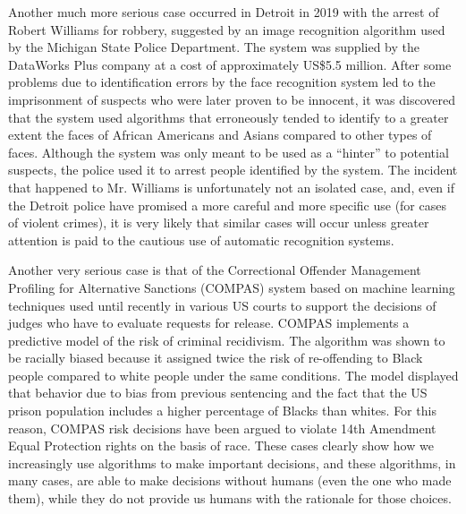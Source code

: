 Another much more serious case occurred in Detroit in 2019 with the arrest of Robert Williams for robbery, suggested by an image recognition algorithm used by the Michigan State Police Department. The system was supplied by the DataWorks Plus company at a cost of approximately US\$5.5 million. After some problems due to identification errors by the face recognition system led to the imprisonment of suspects who were later proven to be innocent, it was discovered that the system used algorithms that erroneously tended to identify to a greater extent the faces of African Americans and Asians compared to other types of faces. Although the system was only meant to be used as a ``hinter'' to potential suspects, the police used it to arrest people identified by the system. The incident that happened to Mr. Williams is unfortunately not an isolated case, and, even if the Detroit police have promised a more careful and more specific use (for cases of violent crimes), it is very likely that similar cases will occur unless greater attention is paid to the cautious use of automatic recognition systems.

Another very serious case is that of the Correctional Offender Management Profiling for Alternative Sanctions (COMPAS) system based on machine learning techniques used until recently in various US courts to support the decisions of judges who have to evaluate requests for release. COMPAS implements a predictive model of the risk of criminal recidivism. The algorithm was shown to be racially biased because it assigned twice the risk\vadjust{\vfill\pagebreak} of re-offending to Black people compared to white people under the same conditions. The model displayed that behavior due to bias from previous sentencing and the fact that the US prison population includes a higher percentage of Blacks than whites. For this reason, COMPAS risk decisions have been argued to violate 14th Amendment Equal Protection rights on the basis of race. These cases clearly show how we increasingly use algorithms to make important decisions, and these algorithms, in many cases, are able to make decisions without humans (even the one who made them), while they do not provide us humans with the rationale for those choices.

